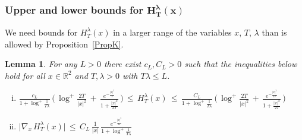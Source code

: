 \documentclass[10pt]{article}
\numberwithin{equation}{section}
\newtheorem{lemma}[theorem]{Lemma}
\theoremstyle{definition}
\newcommand{\R}{{\mathbb R}}
\begin{document}
\subsubsection{Upper and lower  bounds  for $   \boldsymbol{H_{ T}^{\lambda}(x)} $ }


We need bounds for $H_{ T}^{\lambda}(x)$ in a larger range of the variables $x $, $T$, $\lambda$ than is allowed by Proposition~\ref{PropK}.




\begin{lemma} \label{LemmaUpsilonUpDown}  For any $L>0$ there exist  $c_L,C_L>0$ such that the inequalities below hold for all $x\in \R^2$ and $T,\lambda>0 $ with $T\lambda\leq  L  $.

\begin{enumerate}[(i)] \item
$ \displaystyle \frac{c_L  }{ 1+\log^+\frac{1}{T\lambda}  }\,\Bigg(\,    \log^+ \frac{2T}{|x|^2} \,+\,\frac{e^{ -\frac{|x|^2}{T}  }}{ 1+ \frac{|x|^2}{2T} } \,\Bigg)  \,\leq \,H_{ T}^{\lambda}(x)\,\leq  \, \frac{C_L  }{ 1+\log^+\frac{1}{T\lambda}  }\,\Bigg(\,    \log^+ \frac{2T}{|x|^2} \,+\,\frac{e^{ -\frac{|x|^2}{2T}  }}{ 1+ \frac{|x|^2}{2T} }\, \Bigg)      $


\item  $ \displaystyle \big| \nabla_x \,H_{ T}^{\lambda}(x)\big|\,\leq \, C_L\, \frac{1 }{ |x| } \,\frac{e^{- \frac{|x|^2}{2T} }  }{ 1+\log^+\frac{1}{ T\lambda} }  $



\end{enumerate}


\end{lemma}
\end{document}
